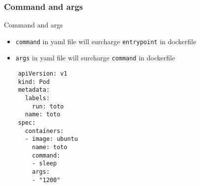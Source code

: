 \subsubsection{Command and args}
\begin{frame}[fragile]{Command and args}
  \begin{itemize}
    \item \texttt{command} in yaml file will surcharge \texttt{entrypoint} in dockerfile
    \item \texttt{args} in yaml file will surcharge \texttt{command} in dockerfile
  \end{itemize}
  \begin{lstlisting}
    apiVersion: v1
    kind: Pod
    metadata:
      labels:
        run: toto
      name: toto
    spec:
      containers:
      - image: ubuntu
        name: toto
        command:
        - sleep
        args:
        - "1200"
\end{lstlisting}
\end{frame}

